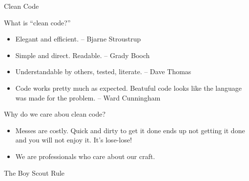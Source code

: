 \documentclass{beamer}
\begin{document}
\begin{frame}[fragile]{Clean Code}


What is ``clean code?''
\begin{itemize}
\item Elegant and efficient. -- Bjarne Stroustrup
\item Simple and direct. Readable.  -- Grady Booch
\item Understandable by others, tested, literate. -- Dave Thomas
\item Code works pretty much as expected.  Beatuful code looks like the language was made for the problem. -- Ward Cunningham
\end{itemize}

Why do we care abou clean code?
\begin{itemize}
\item Messes are costly.  Quick and dirty to get it done ends up not getting it done and you will not enjoy it.  It's lose-lose!
\item We are professionals who care about our craft. 
\end{itemize}

The Boy Scout Rule

\end{frame}
\end{document}
